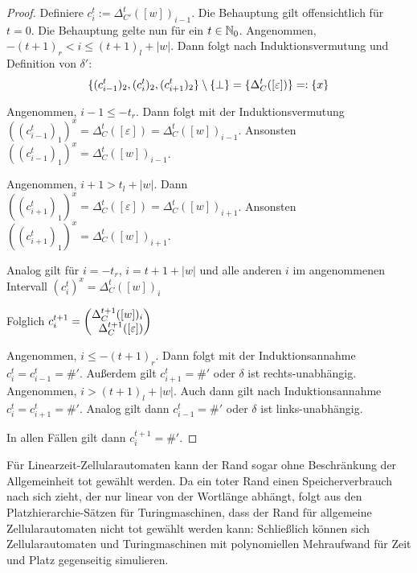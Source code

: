 \begin{proof}
    Definiere $c^t_i := \Delta_{C'}^t([w])_{i-1}$.
    Die Behauptung gilt offensichtlich für $t = 0$.
    Die Behauptung gelte nun für ein $t \in \mathbb{N}_0$.
    Angenommen, $-(t+1)_r < i \leq (t+1)_l + |w|$.
    Dann folgt nach Induktionsvermutung und Definition von $\delta'$: \[
    \{ { (c^t_{i-1})_2, (c^t_{i})_2, (c^t_{i+1})_2} \} \setminus \{ { \perp } \} = \{ { \Delta^t_{C}([\varepsilon])} \} =: \{ {x} \}
    \]
    
    Angenommen, $i - 1 \leq -t_r$. Dann folgt mit der Induktionsvermutung $((c^t_{i-1})_1)^x = \Delta^t_{C}([\varepsilon]) = \Delta^t_{C}([w])_{i-1}$.
    Ansonsten $((c^t_{i-1})_1)^x = \Delta^t_C([w])_{i-1}$.
    
    Angenommen, $i + 1 > t_l + |w|$. Dann $((c^t_{i+1})_1)^x = \Delta^t_{C}([\varepsilon]) = \Delta^t_{C}([w])_{i+1}$.
    Ansonsten $((c^t_{i+1})_1)^x = \Delta^t_C([w])_{i+1}$.
    
    Analog gilt für $i = -t_r$, $i = t + 1 + |w|$ und alle anderen $i$ im angenommenen Intervall $(c^t_{i})^x = \Delta^t_C([w])_i$
    
    Folglich $c^{t+1}_i = \Spvek{\Delta^{t+1}_C([w])_i; \Delta^{t+1}_{C}([\varepsilon])}$
    
    Angenommen, $i \leq -(t+1)_r$. Dann folgt mit der Induktionsannahme $c^t_{i} = c^t_{i-1} = \#'$.
    Außerdem gilt $c^t_{i+1} = \#'$ oder $\delta$ ist rechts-unabhängig.
    Angenommen, $i > (t+1)_l + |w|$. Auch dann gilt nach Induktionsannahme $c^t_{i} = c^t_{i+1} = \#'$.
    Analog gilt dann $c^t_{i-1} = \#'$ oder $\delta$ ist links-unabhängig.
    
    In allen Fällen gilt dann $c^{t+1}_i = \#'$.
\end{proof}

Für Linearzeit-Zellularautomaten kann der Rand sogar ohne Beschränkung der Allgemeinheit tot gewählt werden.
Da ein toter Rand einen Speicherverbrauch nach sich zieht, der nur linear von der Wortlänge abhängt, folgt aus den Platzhierarchie-Sätzen für Turingmaschinen,
dass der Rand für allgemeine Zellularautomaten nicht tot gewählt werden kann:
Schließlich können sich Zellularautomaten und Turingmaschinen mit polynomiellen Mehraufwand für Zeit und Platz gegenseitig simulieren.

